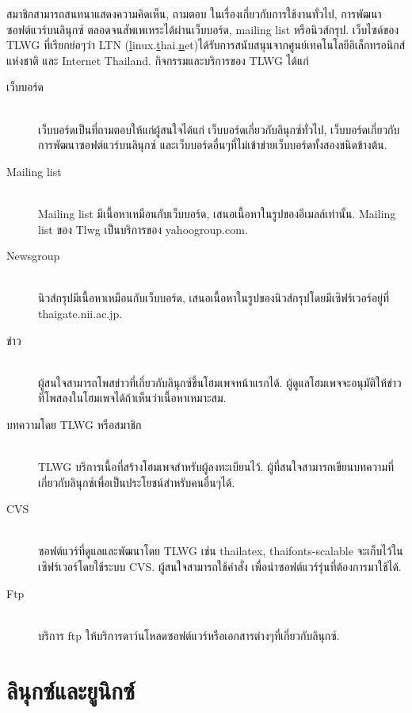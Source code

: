 \begin{thwbr}
{{สมาชิกสามารถสนทนาแสดงความคิดเห็น, ถามตอบ ในเรื่องเกี่ยวกับการใช้งานทั่วไป, การพัฒนาซอฟต์แวร์บนลินุกซ์ ตลอดจนสัพเพเหระได้ผ่านเว็บบอร์ด, mailing list หรือนิวส์กรุป. เว็บไซด์ของ TLWG ที่เรียกย่อๆว่า LTN (\underline{l}inux.\underline{t}hai.\underline{n}et)ได้รับการสนับสนุนจากศูนย์เทคโนโลยีอิเล็กทรอนิกส์แห่งชาติ และ Internet Thailand. กิจกรรมและบริการของ TLWG ได้แก่
\begin{description}
\item[เว็บบอร์ด] \mbox{}\\
เว็บบอร์ดเป็นที่ถามตอบให้แก่ผู้สนใจได้แก่ เว็บบอร์ดเกี่ยวกับลินุกซ์ทั่วไป, เว็บบอร์ดเกี่ยวกับการพัฒนาซอฟต์แวร์บนลินุกซ์ และเว็บบอร์ดอื่นๆที่ไม่เข้าข่ายเว็บบอร์ดทั้งสองชนิดข้างต้น.
\item[Mailing list] \mbox{}\\
Mailing list มีเนื้อหาเหมือนกับเว็บบอร์ด, เสนอเนื้อหาในรูปของอีเมลล์เท่านั้น. Mailing list ของ Tlwg เป็นบริการของ yahoogroup.com.
\item[Newsgroup] \mbox{}\\
นิวส์กรุปมีเนื้อหาเหมือนกับเว็บบอร์ด, เสนอเนื้อหาในรูปของนิวส์กรุปโดยมีเซิฟร์เวอร์อยู่ที่ thaigate.nii.ac.jp.
\item[ข่าว] \mbox{}\\
ผู้สนใจสามารถโพสข่าวที่เกี่ยวกับลินุกซ์ขึ้นโฮมเพจหน้าแรกได้. ผู้ดูแลโฮมเพจจะอนุมัติให้ข่าวที่โพสลงในโฮมเพจได้ถ้าเห็นว่าเนื้อหาเหมาะสม.
\item[บทความโดย TLWG หรือสมาชิก] \mbox{}\\
TLWG บริการเนื้อที่สร้างโฮมเพจสำหรับผู้ลงทะเบียนไว้. ผู้ที่สนใจสามารถเขียนบทความที่เกี่ยวกับลินุกซ์เพื่อเป็นประโยชน์สำหรับคนอื่นๆได้.
\item[CVS] \mbox{}\\
ซอฟต์แวร์ที่ดูแลและพัฒนาโดย TLWG เช่น thailatex, thaifonts-scalable จะเก็บไว้ในเซิฟร์เวอร์โดยใช้ระบบ CVS. ผู้สนใจสามารถใช้คำสั่ง  เพื่อนำซอฟต์แวร์รุ่นที่ต้องการมาใช้ได้.
\item[Ftp] \mbox{}\\
บริการ ftp ให้บริการดาว์นโหลดซอฟต์แวร์หรือเอกสารต่างๆที่เกี่ยวกับลินุกซ์.
\end{description}






\section{ลินุกซ์และยูนิกซ์}

}}
\end{thwbr}
